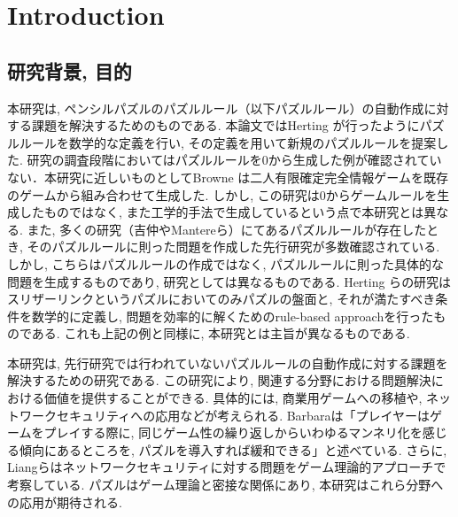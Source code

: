 \chapter{{\rm \bf Introduction}}
\section{研究背景, 目的}
本研究は, ペンシルパズルのパズルルール（以下パズルルール）の自動作成に対する課題を解決するためのものである. 本論文ではHerting \cite{Herting2004}が行ったようにパズルルールを数学的な定義を行い, その定義を用いて新規のパズルルールを提案した. 研究の調査段階においてはパズルルールを0から生成した例が確認されていない．本研究に近しいものとしてBrowne\cite{Browne2010} は二人有限確定完全情報ゲームを既存のゲームから組み合わせて生成した. しかし, この研究は0からゲームルールを生成したものではなく, また工学的手法で生成しているという点で本研究とは異なる. また, 多くの研究（吉仲\cite{Yoshinaka2012}やMantereら\cite{Mantere2007}）にてあるパズルルールが存在したとき, そのパズルルールに則った問題を作成した先行研究が多数確認されている. しかし, こちらはパズルルールの作成ではなく, パズルルールに則った具体的な問題を生成するものであり, 研究としては異なるものである. Herting	ら\cite{Herting2004}の研究はスリザーリンクというパズルにおいてのみパズルの盤面と, それが満たすべき条件を数学的に定義し, 問題を効率的に解くためのrule-based approachを行ったものである. これも上記の例と同様に, 本研究とは主旨が異なるものである.

本研究は, 先行研究では行われていないパズルルールの自動作成に対する課題を解決するための研究である. この研究により, 関連する分野における問題解決における価値を提供することができる. 具体的には, 商業用ゲームへの移植や, ネットワークセキュリティへの応用などが考えられる. Barbara\cite{Barbara2020}は「プレイヤーはゲームをプレイする際に, 同じゲーム性の繰り返しからいわゆるマンネリ化を感じる傾向にあるところを, パズルを導入すれば緩和できる」と述べている. さらに, Liangら\cite{Liang2013}はネットワークセキュリティに対する問題をゲーム理論的アプローチで考察している. パズルはゲーム理論と密接な関係にあり, 	本研究はこれら分野への応用が期待される.

